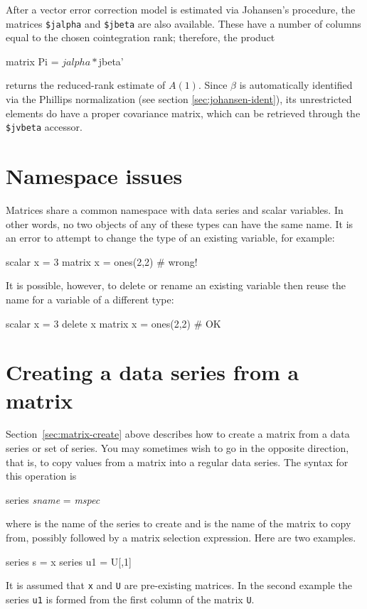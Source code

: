 After a vector error correction model is estimated via Johansen's
procedure, the matrices \verb|$jalpha| and \verb|$jbeta| are
also available. These have a number of columns equal to the chosen
cointegration rank; therefore, the product
\begin{code}
matrix Pi = $jalpha * $jbeta'
\end{code}
returns the reduced-rank estimate of $A(1)$. Since $\beta$ is
automatically identified via the Phillips normalization (see section
\ref{sec:johansen-ident}), its unrestricted elements do have a proper
covariance matrix, which can be retrieved through the
\verb|$jvbeta| accessor.

\section{Namespace issues}
\label{matrix-namespace}

Matrices share a common namespace with data series and scalar
variables.  In other words, no two objects of any of these types can
have the same name.  It is an error to attempt to change the type of
an existing variable, for example:
%
\begin{code}
scalar x = 3
matrix x = ones(2,2) # wrong!
\end{code}
%
It is possible, however, to delete or rename an existing variable then
reuse the name for a variable of a different type:
\begin{code}
scalar x = 3
delete x
matrix x = ones(2,2) # OK
\end{code}


\section{Creating a data series from a matrix}
\label{matrix-create-series}

Section~\ref{sec:matrix-create} above describes how to create a matrix
from a data series or set of series.  You may sometimes wish to go in
the opposite direction, that is, to copy values from a matrix 
into a regular data series.  The syntax for this operation is
%
\begin{textcode}
series \textsl{sname} = \textsl{mspec}
\end{textcode}
%
where  is the name of the series to create and
 is the name of the matrix to copy from, possibly followed
by a matrix selection expression.  Here are two examples.
%
\begin{code}
series s = x
series u1 = U[,1]
\end{code}
%
It is assumed that \texttt{x} and \texttt{U} are pre-existing
matrices.  In the second example the series \texttt{u1} is formed from
the first column of the matrix \texttt{U}.


